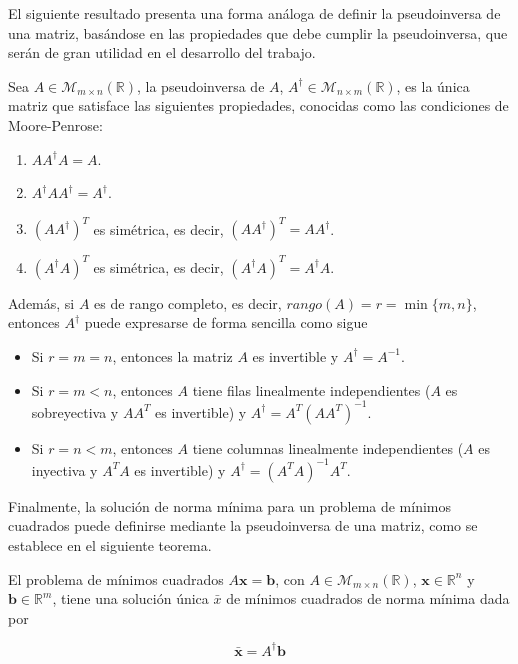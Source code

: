El siguiente resultado presenta una forma análoga de definir la pseudoinversa de una matriz, basándose en las propiedades que debe cumplir la pseudoinversa, que serán de gran utilidad en el desarrollo del trabajo.
\begin{definicion}
    Sea $A \in \mathcal{M}_{m \times n}(\mathbb{R})$, la pseudoinversa de $A$, $A^{\dagger} \in \mathcal{M}_{n \times m}(\mathbb{R})$, es la única matriz que satisface las siguientes propiedades, conocidas como las condiciones de Moore-Penrose:

    \begin{enumerate}
        \item $A A^{\dagger} A = A$.
        \item $A^{\dagger} A A^{\dagger} = A^{\dagger}$.
        \item ${(A A^{\dagger})}^{T}$ es simétrica, es decir, ${(A A^{\dagger})}^{T} = A A^{\dagger}$.
        \item ${(A^{\dagger} A)}^{T}$ es simétrica, es decir, ${(A^{\dagger} A)}^{T} = A^{\dagger} A$.
    \end{enumerate}

    Además, si $A$ es de rango completo, es decir, $rango(A) = r  = \min\{m, n\}$, entonces $A^{\dagger}$ puede expresarse de forma sencilla como sigue

    \begin{itemize}
        \item Si $r = m = n$, entonces la matriz $A$ es invertible y $A^{\dagger} = A^{-1}$.
        \item Si $r = m < n$, entonces $A$ tiene filas linealmente independientes ($A$ es sobreyectiva y $AA^{T}$ es invertible) y $A^{\dagger} = A^{T}{(AA^{T})}^{-1}$.
        \item Si $r = n < m$, entonces $A$ tiene columnas linealmente independientes ($A$ es inyectiva y $A^{T}A$ es invertible) y $A^{\dagger} = {(A^{T}A)}^{-1} A^{T}$.\newline
    \end{itemize}
\end{definicion}

Finalmente, la solución de norma mínima para un problema de mínimos cuadrados puede definirse mediante la pseudoinversa de una matriz, como se establece en el siguiente teorema.

\begin{teorema}
    El problema de mínimos cuadrados $A\mathbf{x}=\mathbf{b}$, con $A \in \mathcal{M}_{m \times n}(\mathbb{R})$, $\mathbf{x} \in \mathbb{R}^{n}$ y $\mathbf{b} \in \mathbb{R}^{m}$, tiene una solución única $\bar{x}$ de mínimos cuadrados de norma mínima dada por

    \[ \bar{\mathbf{x}} = A^{\dagger}\mathbf{b} \]
\end{teorema}

